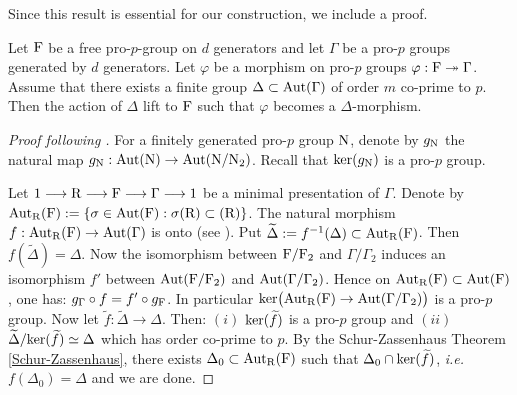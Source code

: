 \documentclass[12pt,a4paper,twoside,english]{smfart}
\def\F{{\rm F}}
\def\N{{\rm N}}
\def\R{{\rm R}}
\def\Aut{{\rm Aut}}
\def\ker{{\rm ker}}
\begin{document}
Since this result is essential for our construction, we include a proof.

 \begin{lemm}\label{wingberg0}
 Let  $\F$ be a free pro-$p$-group on $d$ generators and let $\Gamma$ be a pro-$p$ groups generated by $d$ generators.
  Let $\varphi$ be a morphism on pro-$p$ groups
  $\varphi : \F \twoheadrightarrow \Gamma$. Assume that there exists a finite group $\Delta \subset \Aut(\Gamma) $ of order $m$ co-prime to $p$. Then the action of $\Delta$ lift to  
  $\F$ such that  $\varphi$ becomes a $\Delta$-morphism. 
  \end{lemm}
 
 \begin{proof}[Proof following \cite{wingberg}]
 For a finitely generated pro-$p$ group $\N$, denote by $g_\N$ the natural map  $ g_\N: \Aut(\N) \rightarrow \Aut(\N/\N_2)$. Recall that $\ker(g_\N)$ is a pro-$p$ group.
 
 Let $\displaystyle{1 \longrightarrow \R \longrightarrow \F \longrightarrow \Gamma \longrightarrow 1}$ be a minimal presentation of $\Gamma $. Denote by $\Aut_\R(\F):=\{\sigma \in \Aut(\F):  \sigma(\R) \subset (\R)\}$.
  The  natural morphism $f : \Aut_\R(\F) \rightarrow \Aut(\Gamma)$ is onto (see \cite[Proposition 4.5.4]{RZ}).
  Put $\widetilde{\Delta}:= f^{-1}(\Delta) \subset \Aut_\R(\F)$. Then $f(\widetilde{\Delta})=\Delta$.
   Now the isomorphism between $\F/\F_2$ and $\Gamma/\Gamma_2$ induces an isomorphism $f'$ between $\Aut(\F/\F_2)$ and $\Aut(\Gamma/\Gamma_2)$.
Hence  on $\Aut_\R(\F) \subset \Aut(\F)$, one has: $g_\Gamma\circ f = f'\circ g_\F$. In particular $\ker\big(\Aut_\R(\F) \rightarrow \Aut(\Gamma/\Gamma_2)\big)$ is a pro-$p$ group. Now let $\widetilde{f} : \widetilde{\Delta} \rightarrow \Delta$. Then: $(i)$ $\ker(\widetilde{f})$ is a  pro-$p$ group and $(ii)$  $\widetilde{\Delta}/\ker(\widetilde{f}) \simeq \Delta$ which has order co-prime to $p$. By the Schur-Zassenhaus Theorem \ref{Schur-Zassenhaus}, there exists $\Delta_0 \subset \Aut_\R(\F)$ such that $\Delta_0 \cap \ker(\widetilde{f})$, {\it i.e.} $f(\Delta_0)=\Delta$ and we are done.
 \end{proof}
 
\end{document}
